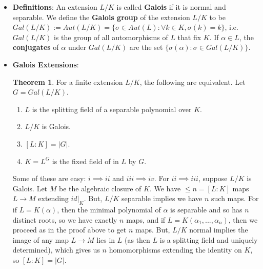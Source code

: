 \documentclass[11pt, oneside]{amsart}   	%
\theoremstyle{definition}
\newtheorem{theorem}{Theorem}[section]
\begin{document}
\begin{itemize}

	\item \textbf{Definitions}: An extension $L / K$ is called \textbf{Galois} if it is normal and separable. We define the \textbf{Galois group} of 
	the extension $L / K$ to be $Gal(L / K) := Aut(L / K) = \{\sigma\in Aut(L) : \forall k\in K, \sigma(k) = k\}$, i.e. $Gal(L / K)$ is the group of all 
	automorphisms of $L$ that fix $K$. If $\alpha\in L$, the \textbf{conjugates} of $\alpha$ under $Gal(L / K)$ are the set $\{\sigma(\alpha) : \sigma 
	\in Gal(L / K)\}$.
	
	\item \textbf{Galois Extensions}:
		
	\begin{theorem}
	
		For a finite extension $L / K$, the following are equivalent. Let $G = Gal(L / K)$.
		
		\begin{enumerate}
		
			\item $L$ is the splitting field of a separable polynomial over $K$.
			
			\item $L / K$ is Galois.
			
			\item $[L : K] = |G|$.
			
			\item $K = L^G$ is the fixed field of in $L$ by $G$.
		
		\end{enumerate}
	
	\end{theorem}
	
	Some of these are easy: $i\implies ii$ and $iii\implies iv$. For $ii\implies iii$, suppose $L / K$ is Galois. Let $M$ be the algebraic closure of $K$. We 
	have $\leq n = [L : K]$ maps $L\rightarrow M$ extending $id |_K$. But, $L / K$ separable implies we have $n$ such maps. For if $L = K(\alpha)$, 
	then the minimal polynomial of $\alpha$ is separable and so has $n$ distinct roots, so we have exactly $n$ maps, and if $L = K(\alpha_1, ..., 
	\alpha_n)$, then we proceed as in the proof above to get $n$ maps. But, $L / K$ normal implies the image of any map $L\rightarrow M$ lies in $L$ 
	(as then $L$ is a splitting field and uniquely determined), which gives us $n$ homomorphisms extending the identity on $K$, so $[L : K] = |G|$. 
	

\end{itemize}
\end{document}
